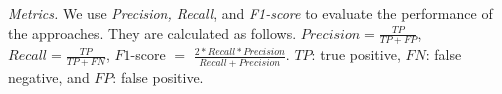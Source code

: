 
{\em Metrics.} We use \emph{Precision, Recall}, and {\em F1-score} to
evaluate the performance of the approaches. They are calculated as follows.
$Precision = \frac{TP}{TP+FP}$, $Recall = \frac{TP}{TP+FN}$, $F1$-score
$=$ $\frac{2*Recall*Precision}{Recall+Precision}$. $TP$: true
positive, $FN$: false negative, and $FP$: false positive.
